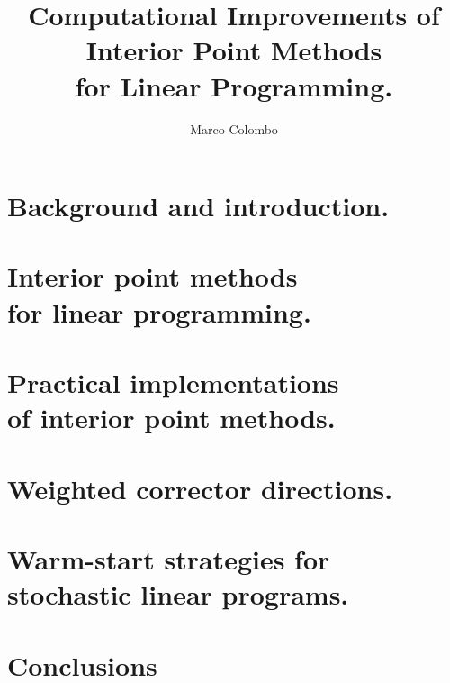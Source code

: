 \documentclass[phd,draft,usequotes,leftchapter]{msthesis}
\title{Computational Improvements of \\
       Interior Point Methods \\
       for Linear Programming.}
\author{Marco Colombo}
\begin{document}
\maketitle

\dedication{For my family and my friends.\\
            Se'n foi me de chesta br\"ogna ch\'e?}
\standarddeclaration

%
%
\begin{abstract}
  
\end{abstract}

%
%
\begin{acknowledgements}
  
\end{acknowledgements}

%
%
\tableofcontents

%
%
\chapter{Background and introduction.}


\chapter[Interior point methods for linear programming.]{Interior point methods \\ for linear programming.}


\chapter[Practical implementations of interior point methods.]{Practical implementations \\ of interior point methods.}


\chapter{Weighted corrector directions.}


\chapter[Warm-start strategies for stochastic linear programs.]{Warm-start strategies for \\stochastic linear programs.}


\chapter{Conclusions}


%
%
%

%
%
%



%
%
\end{document}
